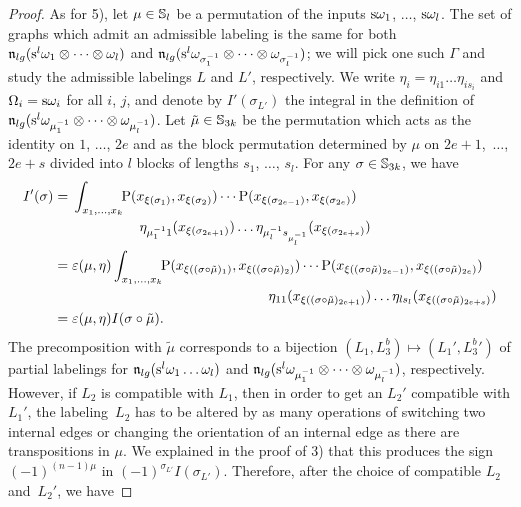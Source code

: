 \documentclass[\MainFolder/Text.tex]{subfiles}
\begin{document}
\begin{proof}
As for 5), let $\mu\in \mathbb{S}_l$ be a permutation of the inputs $\mathrm{s} \omega_1$, $\dotsc$, $\mathrm{s} \omega_l$. The set of graphs which admit an admissible labeling is the same for both $\mathfrak{n}_{lg}(\mathrm{s}^l \omega_1 \otimes \dotsb \otimes \omega_l)$ and $\mathfrak{n}_{lg}(\mathrm{s}^l \omega_{\sigma_{1}^{-1}} \otimes \dotsb \otimes \omega_{\sigma_l^{-1}})$; we will pick one such $\Gamma$ and study the admissible labelings $L$ and $L'$, respectively. We write $\eta_i = \eta_{i1}\dots \eta_{i s_i}$ and $\Omega_i = \mathrm{s} \omega_i$ for all $i$, $j$, and denote by $I'(\sigma_{L'})$ the integral in the definition of $\mathfrak{n}_{lg}(\mathrm{s}^l \omega_{\mu_1^{-1}} \otimes \dotsb \otimes \omega_{\mu_l^{-1}})$. Let $\tilde{\mu}\in \mathbb{S}_{3k}$ be the permutation which acts as the identity on $1$, $\dotsc$, $2e$ and as the block permutation determined by $\mu$ on $2e + 1$,~$\dotsc$, $2e+s$ divided into $l$ blocks of lengths $s_1$, $\dotsc$, $s_l$. For any $\sigma\in \mathbb{S}_{3k}$, we have
$$ \begin{aligned}
I'(\sigma) & = \begin{multlined}[t]\int_{x_1,\dotsc,x_k}\!\! \Prpg(x_{\xi(\sigma_1)},x_{\xi(\sigma_2)}) \dotsm \Prpg(x_{\xi(\sigma_{2e-1})},x_{\xi(\sigma_{2e})}) \\ \eta_{\mu_1^{-1} 1}(x_{\xi(\sigma_{2e+1})}) \dots \eta_{\mu_l^{-1} s_{\mu_l^{-1}}}(x_{\xi(\sigma_{2e+s})})\end{multlined} \\
 & = \begin{multlined}[t]\varepsilon(\mu,\eta) \int_{x_1,\dotsc,x_k} \!\! \Prpg(x_{\xi((\sigma\circ\tilde{\mu})_1)},x_{\xi((\sigma\circ\tilde{\mu})_2)}) \dotsm \Prpg(x_{\xi((\sigma\circ \tilde{\mu})_{2e-1})},x_{\xi((\sigma\circ\tilde{\mu})_{2e})}) \\ \eta_{11}(x_{\xi((\sigma\circ \tilde{\mu})_{2e+1})})\dots  \eta_{ls_l}(x_{\xi((\sigma\circ \tilde{\mu})_{2e+s})})\end{multlined} \\
 & = \varepsilon(\mu,\eta) I(\sigma \circ \tilde{\mu}).
\end{aligned} $$
The precomposition with $\tilde{\mu}$ corresponds to a bijection $(L_1,L_3^b)\mapsto (L_1', {L_3^{b}}')$ of partial labelings for $\mathfrak{n}_{lg}(\mathrm{s}^l \omega_1 \dots \omega_l)$ and $\mathfrak{n}_{lg}(\mathrm{s}^l \omega_{\mu_1^{-1}} \otimes \dotsb \otimes \omega_{\mu_l^{-1}})$, respectively. However, if $L_2$ is compatible with $L_1$, then in order to get an $L_2'$ compatible with $L_1'$, the labeling~$L_2$ has to be altered by as many operations of switching two internal edges or changing the orientation of an internal edge as there are transpositions in $\mu$. We explained in the proof of 3) that this produces the sign $(-1)^{(n-1)\mu}$ in $(-1)^{\sigma_{L'}}I(\sigma_{L'})$. Therefore, after the choice of compatible $L_2$ and~$L_2'$, we have

\end{proof}
\end{document}
